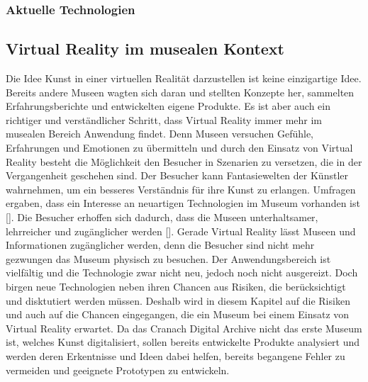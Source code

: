 \documentclass[a4paper,12pt,oneside]{article}
\begin{document}
        \subsubsection{Aktuelle Technologien}

    \subsection{Virtual Reality im musealen Kontext}
      Die Idee Kunst in einer virtuellen Realität darzustellen ist keine einzigartige Idee.
      Bereits andere Museen wagten sich daran und stellten Konzepte her, sammelten
      Erfahrungsberichte und entwickelten eigene Produkte. Es ist
      aber auch ein richtiger und verständlicher Schritt, dass Virtual Reality immer mehr
      im musealen Bereich Anwendung findet. Denn Museen versuchen Gefühle,
      Erfahrungen und Emotionen zu übermitteln und durch den Einsatz von Virtual Reality
      besteht die Möglichkeit den Besucher in Szenarien zu versetzen, die in der
      Vergangenheit geschehen sind. Der Besucher kann Fantasiewelten der Künstler
      wahrnehmen, um ein besseres Verständnis für ihre Kunst zu erlangen. Umfragen ergaben, 
      dass ein Interesse an neuartigen Technologien im Museum vorhanden ist [\cite[34]{Heidsiek2019}].
      Die Besucher erhoffen sich dadurch, dass die Museen unterhaltsamer, lehrreicher und
      zugänglicher werden [\cite[34]{Heidsiek2019}]. Gerade Virtual Reality lässt Museen
      und Informationen zugänglicher werden, denn die Besucher sind nicht mehr gezwungen 
      das Museum physisch zu besuchen. Der Anwendungsbereich ist vielfältig und die 
      Technologie zwar nicht neu, jedoch noch nicht ausgereizt.
      Doch birgen neue Technologien neben ihren Chancen aus Risiken, die berücksichtigt
      und disktutiert werden müssen. Deshalb wird in diesem Kapitel auf die
      Risiken und auch auf die Chancen eingegangen, die ein Museum bei einem Einsatz von
      Virtual Reality erwartet. Da das Cranach Digital Archive nicht das erste Museum ist, 
      welches Kunst digitalisiert, sollen bereits entwickelte Produkte analysiert und 
      werden deren Erkentnisse und Ideen dabei helfen, bereits begangene Fehler zu 
      vermeiden und geeignete Prototypen zu entwickeln.
\end{document}
